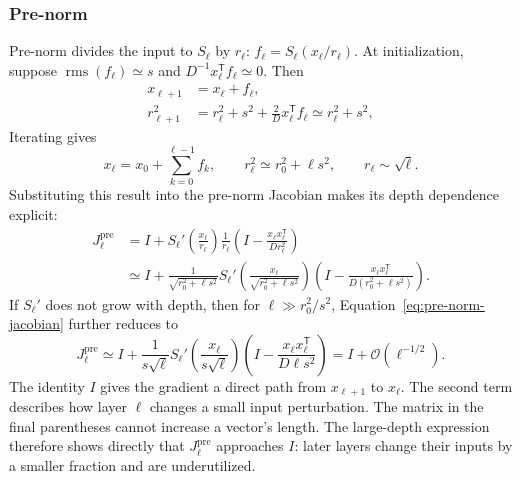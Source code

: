 \documentclass[11pt]{article}
\begin{document}
\subsubsection*{Pre-norm}
Pre-norm divides the input to $S_\ell$ by $r_\ell$:
$f_\ell=S_\ell(x_\ell/r_\ell)$.  At initialization, suppose
$\operatorname{rms}(f_\ell)\simeq s$ and
$D^{-1}x_\ell^{\mathsf T}f_\ell\simeq0$.  Then
\begin{align}
  x_{\ell+1}&=x_\ell+f_\ell,\\
  r_{\ell+1}^2
  &=r_\ell^2+s^2+\frac{2}{D}x_\ell^{\mathsf T}f_\ell
   \simeq r_\ell^2+s^2,
\end{align}
Iterating gives
\begin{equation}
  x_\ell=x_0+\sum_{k=0}^{\ell-1}f_k,
  \qquad
  r_\ell^2\simeq r_0^2+\ell s^2,
  \qquad r_\ell\sim\sqrt{\ell}.
\end{equation}
Substituting this result into the pre-norm Jacobian makes its depth dependence
explicit:
\begin{equation}
  \begin{aligned}
    J_\ell^{\mathrm{pre}}
    &=I+S_\ell'\!\left(\frac{x_\ell}{r_\ell}\right)
      \frac{1}{r_\ell}
      \left(I-\frac{x_\ell x_\ell^{\mathsf T}}{D r_\ell^2}\right)\\
    &\simeq I+
      \frac{1}{\sqrt{r_0^2+\ell s^2}}
      S_\ell'\!\left(
        \frac{x_\ell}{\sqrt{r_0^2+\ell s^2}}
      \right)
      \left(
        I-\frac{x_\ell x_\ell^{\mathsf T}}
                 {D(r_0^2+\ell s^2)}
      \right).
  \end{aligned}
  \label{eq:pre-norm-jacobian}
\end{equation}
If $S_\ell'$ does not grow with depth, then for
$\ell\gg r_0^2/s^2$, Equation~\eqref{eq:pre-norm-jacobian} further reduces to
\[
  J_\ell^{\mathrm{pre}}
  \simeq I+
  \frac{1}{s\sqrt{\ell}}
  S_\ell'\!\left(\frac{x_\ell}{s\sqrt{\ell}}\right)
  \left(I-\frac{x_\ell x_\ell^{\mathsf T}}{D\ell s^2}\right)
  =I+\mathcal{O}\!\left(\ell^{-1/2}\right).
\]
The identity $I$ gives the gradient a direct path from $x_{\ell+1}$ to
$x_\ell$.  The second term describes how layer $\ell$ changes a small input
perturbation.  The matrix in the final parentheses cannot increase a vector's
length.  The large-depth expression therefore shows directly that
$J_\ell^{\mathrm{pre}}$ approaches $I$: later layers change their inputs by a
smaller fraction and are underutilized.
\end{document}
